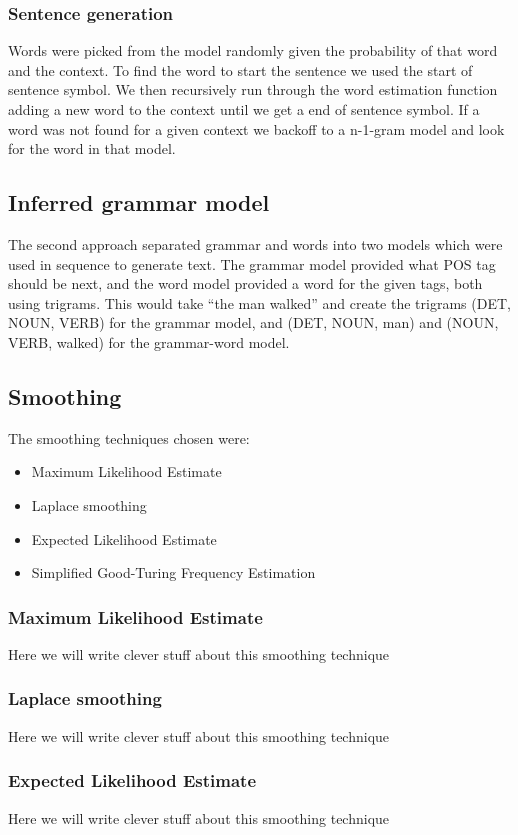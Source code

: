\documentclass[a4paper,12pt]{article}
\begin{document}
\subsubsection{Sentence generation}
Words were picked from the model randomly given the probability of that word and the context. To find the word to start the sentence we used the start of sentence symbol. We then recursively run through the word estimation function adding a new word to the context until we get a end of sentence symbol. If a word was not found for a given context we backoff to a n-1-gram model and look for the word in that model.

\subsection{Inferred grammar model}
The second approach separated grammar and words into two models which were used in sequence to generate text. The grammar model provided what POS tag should be next, and the word model provided a word for the given tags, both using trigrams. This would take ``the man walked'' and create the trigrams (DET, NOUN, VERB) for the grammar model, and (DET, NOUN, man) and (NOUN, VERB, walked) for the grammar-word model.

\subsection{Smoothing}
The smoothing techniques chosen were:
\begin{itemize}
\item Maximum Likelihood Estimate
\item Laplace smoothing
\item Expected Likelihood Estimate
\item Simplified Good-Turing Frequency Estimation
\end{itemize}

\subsubsection{Maximum Likelihood Estimate}
Here we will write clever stuff about this smoothing technique

\subsubsection{Laplace smoothing}
Here we will write clever stuff about this smoothing technique

\subsubsection{Expected Likelihood Estimate}
Here we will write clever stuff about this smoothing technique
\end{document}
